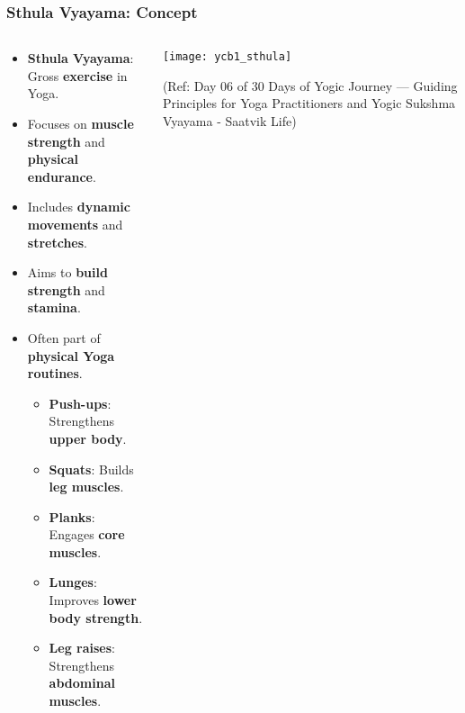 \begin{frame}[fragile]\frametitle{Sthula Vyayama: Concept}
\begin{columns}
    \begin{column}[T]{0.5\linewidth}
      \begin{itemize}
        \item \textbf{Sthula Vyayama}: Gross \textbf{exercise} in Yoga.
        \item Focuses on \textbf{muscle strength} and \textbf{physical endurance}.
        \item Includes \textbf{dynamic movements} and \textbf{stretches}.
        \item Aims to \textbf{build strength} and \textbf{stamina}.
        \item Often part of \textbf{physical Yoga routines}.
			  \begin{itemize}
				\item \textbf{Push-ups}: Strengthens \textbf{upper body}.
				\item \textbf{Squats}: Builds \textbf{leg muscles}.
				\item \textbf{Planks}: Engages \textbf{core muscles}.
				\item \textbf{Lunges}: Improves \textbf{lower body strength}.
				\item \textbf{Leg raises}: Strengthens \textbf{abdominal muscles}.
			  \end{itemize}		
      \end{itemize}
    \end{column}
    \begin{column}[T]{0.5\linewidth}
        \begin{center}
		\texttt{[image: ycb1\_sthula]}
		
		{\tiny (Ref: Day 06 of 30 Days of Yogic Journey — Guiding Principles for Yoga Practitioners and Yogic Sukshma Vyayama - Saatvik Life)}	
        \end{center}	
    \end{column}
\end{columns}
\end{frame}

